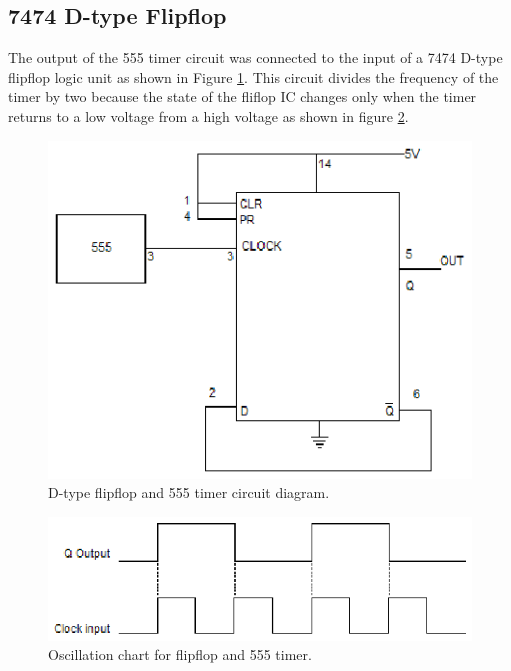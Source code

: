 \documentclass[11pt,onecolumn,letter]{article}
\begin{document}
\subsection{7474 D-type Flipflop}\label{subsec:Flipflop}
The output of the 555 timer circuit was connected to the input of a 7474 D-type flipflop logic unit as shown in Figure \ref{fig:Flipflop}. This circuit divides the frequency of the timer by two because the state of the fliflop IC changes only when the timer returns to a low voltage from a high voltage as shown in figure \ref{flipflopChart}.
%
%
\begin{figure}
\center
\includegraphics{flipflop.eps}
\caption{D-type flipflop and 555 timer circuit diagram.}\label{fig:Flipflop}
\end{figure}
%
%
\begin{figure}
\center
\includegraphics{flipflopChart.eps}
\caption{Oscillation chart for flipflop and 555 timer.}\label{flipflopChart}
\end{figure}

%
%
\end{document}
